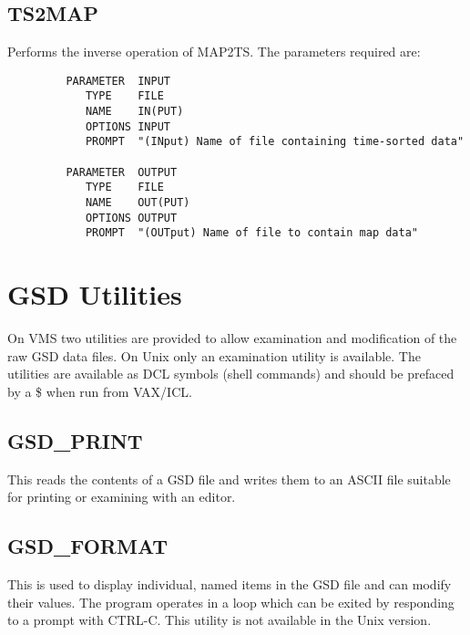 \goodbreak

\subsection{TS2MAP}

Performs the inverse operation of MAP2TS. The parameters required are:

\begin{small}
\begin{verbatim}
         PARAMETER  INPUT
            TYPE    FILE
            NAME    IN(PUT)
            OPTIONS INPUT
            PROMPT  "(INput) Name of file containing time-sorted data"

         PARAMETER  OUTPUT
            TYPE    FILE
            NAME    OUT(PUT)
            OPTIONS OUTPUT
            PROMPT  "(OUTput) Name of file to contain map data"
\end{verbatim}
\end{small}


\goodbreak

\section{GSD Utilities}

On VMS two utilities are provided to allow examination and  modification of
the raw GSD data files. On Unix only an examination utility is
available.
The utilities are available as DCL symbols (shell commands) and should
be prefaced by a \$ when run from VAX/ICL.

\subsection{GSD\_PRINT}

This reads the contents of a GSD file and writes them to an ASCII file
suitable for printing or examining with an editor.

\subsection{GSD\_FORMAT}

This is used to display individual, named items in the GSD file and
can modify their values. The program operates in a loop which can be
exited by responding to a prompt with CTRL-C. This utility is not
available in the Unix version.

\goodbreak

